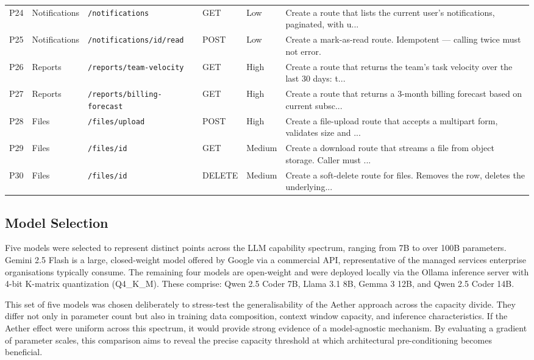 \documentclass[review,12pt,3p]{elsarticle}
\begin{document}
\begin{table}[htbp]
{\begin{tabular}{llllll}
P24 & Notifications & \texttt{/notifications} & GET & Low & Create a route that lists the current user's notifications, paginated, with u... \\
P25 & Notifications & \texttt{/notifications/\:id/read} & POST & Low & Create a mark-as-read route. Idempotent — calling twice must not error. \\
P26 & Reports & \texttt{/reports/team-velocity} & GET & High & Create a route that returns the team's task velocity over the last 30 days: t... \\
P27 & Reports & \texttt{/reports/billing-forecast} & GET & High & Create a route that returns a 3-month billing forecast based on current subsc... \\
P28 & Files & \texttt{/files/upload} & POST & High & Create a file-upload route that accepts a multipart form, validates size and ... \\
P29 & Files & \texttt{/files/\:id} & GET & Medium & Create a download route that streams a file from object storage. Caller must ... \\
P30 & Files & \texttt{/files/\:id} & DELETE & Medium & Create a soft-delete route for files. Removes the row, deletes the underlying... \\
\bottomrule
\end{tabular}
}
\end{table}
\subsection{Model Selection}

Five models were selected to represent distinct points across the LLM capability spectrum, ranging from 7B to over 100B parameters. Gemini 2.5 Flash is a large, closed-weight model offered by Google via a commercial API, representative of the managed services enterprise organisations typically consume. The remaining four models are open-weight and were deployed locally via the Ollama inference server with 4-bit K-matrix quantization (Q4\_K\_M). These comprise: Qwen 2.5 Coder 7B, Llama 3.1 8B, Gemma 3 12B, and Qwen 2.5 Coder 14B.

This set of five models was chosen deliberately to stress-test the generalisability of the Aether approach across the capacity divide. They differ not only in parameter count but also in training data composition, context window capacity, and inference characteristics. If the Aether effect were uniform across this spectrum, it would provide strong evidence of a model-agnostic mechanism. By evaluating a gradient of parameter scales, this comparison aims to reveal the precise capacity threshold at which architectural pre-conditioning becomes beneficial.
\end{document}
